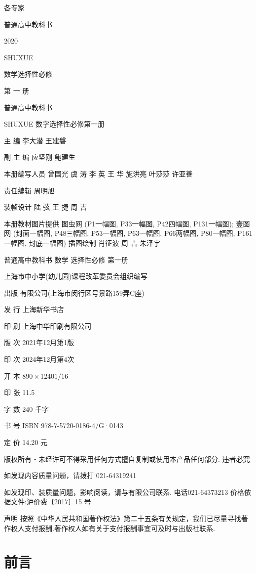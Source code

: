 \documentclass[10pt]{article}
\begin{document}
各专家

普通高中教科书

2020

SHUXUE

数学选择性必修

第 一 册



普通高中教科书

SHUXUE 数字选择性必修第一册

主 编 李大潜 王建磐

副 主 编 应坚刚 鲍建生

本册编写人员 曾国光 虞 涛 李 英 王 华 施洪亮 叶莎莎 许亚善

责任编辑 周明旭

装帧设计 陆 弦 王 捷 周 吉

本册教材图片提供 图虫网 (P1一幅图, P33一幅图, P42四幅图, P131一幅图); 壹图网 (封面一幅图, P48三幅图, P53一幅图, P63一幅图, P66两幅图, P80一幅图, P161一幅图, 封底一幅图) 插图绘制 肖征波 周 吉 朱泽宇

普通高中教科书 数学 选择性必修 第一册

上海市中小学(幼儿园)课程改革委员会组织编写

出版 有限公司(上海市闵行区号景路159弄C座)

发 行 上海新华书店

印 刷 上海中华印刷有限公司

版 次 2021年12月第1版

印 次 2024年12月第4次

开 本 \({890} \times  {1240}\mathrm{1/{16}}\)

印 张 11.5

字 数 240 千字

书 号 ISBN 978-7-5720-0186-4/G·0143

定 价 14.20 元

版权所有・未经许可不得采用任何方式擅自复制或使用本产品任何部分. 违者必究

如发现内容质量问题，请拨打 021-64319241

如发现印、装质量问题，影响阅读，请与有限公司联系. 电话021-64373213 价格依据文件:沪价费〔2017〕15 号

声明 按照《中华人民共和国著作权法》第二十五条有关规定，我们已尽量寻找著作权人支付报酬.著作权人如有关于支付报酬事宜可及时与出版社联系.

\section*{前言}
\end{document}
